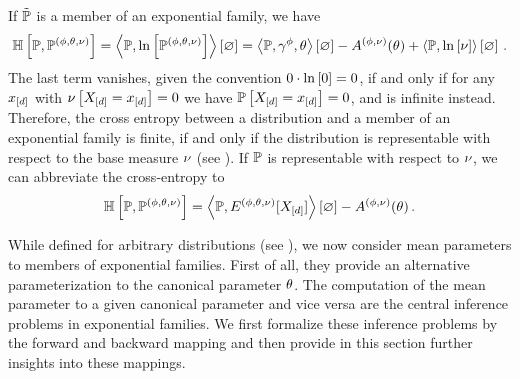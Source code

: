 \begin{example}
    \label{exa:cEntropyExp}
    If $\tilde{\mathbb{P}}$ is a member of an exponential family, we have %
    \begin{align*}
        \mathbb{H}\left[\mathbb{P},\mathbb{P}^{(\phi,\theta,\nu)}\right]
        = \left\langle \mathbb{P},\ln \left[ \mathbb{P}^{(\phi,\theta,\nu)} \right]\right\rangle \left[ \varnothing \right]
        = \left\langle \mathbb{P},\gamma^{\phi},\theta\right\rangle \left[ \varnothing \right] - A^{(\phi,\nu)}(\theta) + \left\langle \mathbb{P},\ln \left[ \nu \right]\right\rangle \left[ \varnothing \right] \, .
    \end{align*}
    The last term vanishes, given the convention $0\cdot\ln \left[ 0 \right]=0$, if and only if for any $x_{[d]}$ with $\nu\left[X_{[d]}=x_{[d]}\right]=0$ we have $\mathbb{P}\left[X_{[d]}=x_{[d]}\right]=0$, and is infinite instead.
    Therefore, the cross entropy between a distribution and a member of an exponential family is finite, if and only if the distribution is representable with respect to the base measure $\nu$ (see ).
    If $\mathbb{P}$ is representable with respect to $\nu$, we can abbreviate the cross-entropy to
    \begin{align*}
        \mathbb{H}\left[\mathbb{P},\mathbb{P}^{(\phi,\theta,\nu)}\right]
        = \left\langle \mathbb{P},E^{(\phi,\theta,\nu)}[X_{[d]}]\right\rangle \left[ \varnothing \right] -A^{(\phi,\nu)}(\theta) \, .
    \end{align*}
\end{example}







While defined for arbitrary distributions (see ), we now consider mean parameters to members of exponential families.
First of all, they provide an alternative parameterization to the canonical parameter $\theta$.
The computation of the mean parameter to a given canonical parameter and vice versa are the central inference problems in exponential families.
We first formalize these inference problems by the forward and backward mapping and then provide in this section further insights into these mappings.

